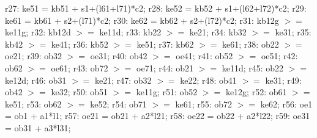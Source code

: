 \documentclass[a4paper,11pt, titlepage]{article}
\begin{document}
\begin{flushleft}
r27: ke51 = kb51 + s1+(l61+l71)*c2;\linebreak
r28: ke52 = kb52 + s1+(l62+l72)*c2;\linebreak
r29: ke61 = kb61 + s2+(l71)*c2;\linebreak
r30: ke62 = kb62 + s2+(l72)*c2;\linebreak
\linebreak
r31: kb12g $>=$ ke11g;\linebreak
r32: kb12d $>=$ ke11d;\linebreak
r33: kb22 $>=$ ke21;\linebreak
r34: kb32 $>=$ ke31;\linebreak
r35: kb42 $>=$ ke41;\linebreak
r36: kb52 $>=$ ke51;\linebreak
r37: kb62 $>=$ ke61;\linebreak
\linebreak
r38: ob22 $>=$ oe21;\linebreak
r39: ob32 $>=$ oe31;\linebreak
r40: ob42 $>=$ oe41;\linebreak
r41: ob52 $>=$ oe51;\linebreak
r42: ob62 $>=$ oe61;\linebreak
r43: ob72 $>=$ oe71;\linebreak
\linebreak
r44: ob21 $>=$ ke11d;\linebreak
r45: ob22 $>=$ ke12d;\linebreak
r46: ob31 $>=$ ke21;\linebreak
r47: ob32 $>=$ ke22;\linebreak
r48: ob41 $>=$ ke31;\linebreak
r49: ob42 $>=$ ke32;\linebreak
r50: ob51 $>=$ ke11g;\linebreak
r51: ob52 $>=$ ke12g;\linebreak
r52: ob61 $>=$ ke51;\linebreak
r53: ob62 $>=$ ke52;\linebreak
r54: ob71 $>=$ ke61;\linebreak
r55: ob72 $>=$ ke62;\linebreak
\linebreak
r56: oe1 = ob1 + a1*l1;\linebreak
r57: oe21 = ob21 + a2*l21;\linebreak
r58: oe22 = ob22 + a2*l22;\linebreak
r59: oe31 = ob31 + a3*l31;\linebreak

\end{flushleft}
\end{document}
